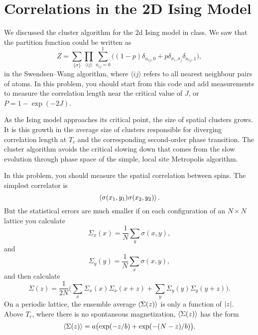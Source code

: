 \section{Correlations in the 2D Ising Model}

We discussed the cluster algorithm for the 2d Ising model in class. We saw that the
partition function could be written as
%
\begin{equation}
    Z = \sum_{\{\sigma\}} \prod_{\langle i j \rangle} \sum_{n_{ij}=0}^1
    \bigl((1 - p) \delta_{n_{ij},0} + p \delta_{\sigma_i,\sigma_j} \delta_{n_{ij},1}\bigr),
\end{equation}
%
in the Swendsen--Wang algorithm,
where \(\langle i j \rangle\) refers to all nearest neighbour pairs of atoms.
In this problem, you should start from this code and add measurements to measure the
correlation length near the critical value of \(J\), or \(P=1 - \exp(-2J)\).

As the Ising model approaches its critical point, the size of spatial clusters grows. It is
this growth in the average size of clusters responsible for diverging correlation
length at \(T_c\) and the corresponding second-order phase transition. The cluster algorithm
avoids the critical slowing down that comes from the slow evolution through phase space of
the simple, local site Metropolis algorithm.

In this problem, you should measure the spatial correlation between spins. The simplest
correlator is
%
\begin{equation}
    \expval{ \sigma(x_1, y_1) \sigma(x_2, y_2) }.
\end{equation}
%
But the statistical errors are much smaller if on each configuration of an \(N \times N\)
lattice you calculate
%
\begin{equation}
    \Sigma_x(x) = \frac{ 1 }{ N } \sum_y \sigma(x, y),
\end{equation}
%
and
%
\begin{equation}
    \Sigma_y(y) = \frac{ 1 }{ N } \sum_x \sigma(x, y),
\end{equation}
%
and then calculate
%
\begin{equation}\label{eq:Sigmaz}
    \Sigma(z) = \frac{ 1 }{ 2N } \biggl( \sum_x \Sigma_x(x) \Sigma_x(x+z)
    + \sum_y \Sigma_y(y) \Sigma_y(y+z) \biggr).
\end{equation}
%
On a periodic lattice, the ensemble average \(\expval{\Sigma(z)}\) is only a
function of \(\abs{z}\). Above \(T_c\),
where there is no spontaneous magnetization, \(\expval{\Sigma(z)}\) has the form
%
\begin{equation}\label{eq:Sigmazbar}
    \expval{\Sigma(z)} = a \bigl(\exp(-z / b) + \exp(-(N - z) / b)\bigr).
\end{equation}

